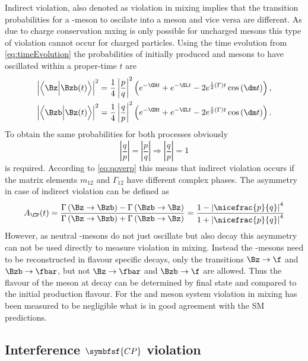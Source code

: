 Indirect \CP violation, also denoted as \CP violation in mixing implies that the transition probabilities for a \Bz-meson to oscilate into a \Bzb meson and vice versa are different.
As due to charge conservation mxing is only possible for uncharged mesons this type of \CP violation cannot occur for charged particles.
Using the time evolution from \cref{eq:timeEvolution} the probabilities of initially produced \Bz and \Bzb mesons to have oscillated within a proper-time $t$ are
\begin{align}
\left|\left<\Bz\Big|\Bzb\!\left(t\right)\right>\right|^2=\frac{1}{4}\left|\frac{p}{q}\right|^2
\left(e^{-\GH t}+e^{-\GL t}-2e^{\frac{1}{2}\left(\Gamma\right)t}\cos\left(\dm t\right)\right),\\
\left|\left<\Bzb\Big|\Bz\!\left(t\right)\right>\right|^2=\frac{1}{4}\left|\frac{q}{p}\right|^2
\left(e^{-\GH t}+e^{-\GL t}-2e^{\frac{1}{2}\left(\Gamma\right)t}\cos\left(\dm t\right)\right).
\end{align}
To obtain the same probabilities for both processes obviously
\begin{equation}
\left|\frac{q}{p}\right|=\left|\frac{p}{q}\right| \Rightarrow \left|\frac{q}{p}\right|=1
\end{equation}
is required.
According to \cref{eq:qoverp} this means that indirect \CP violation occurs if the matrix elements $m_{12}$ and $\Gamma_{12}$ have different complex phases.
The \CP asymmetry in case of indirect \CP violation can be defined as
\begin{equation}
A_{\CP}(t)=\frac{\Gamma\left(\Bz\to\Bzb\right) - \Gamma\left(\Bzb\to\Bz\right)}{\Gamma\left(\Bz\to\Bzb\right) + \Gamma\left(\Bzb\to\Bz\right)}
= \frac{1-\left|\nicefrac{p}{q}\right|^4}{1+\left|\nicefrac{p}{q}\right|^4}
\end{equation}
However, as neutral \B-mesons do not just oscillate but also decay this asymmetry can not be used directly to measure \CP violation in mixing.
Instead the \B-mesons need to be reconstructed in flavour specific decays, \ie only the transitions $\Bz\to\f$ and $\Bzb\to\fbar$, but not $\Bz\to\fbar$ and $\Bzb\to\f$ are allowed.
Thus the flavour of the meson at decay can be determined by final state and compared to the initial production flavour.
For the \Bz and \Bs meson system \CP violation in mixing has been measured to be negligible \cite{HFLAV2016} what is in good agreement with the \ac{SM} predictions.

\subsection[head={Interference \CP violation},tocentry={Interference \CP violation}]{Interference $\symbfsf{C{}P}$ violation}
\label{sec:InterferenceCPV}

